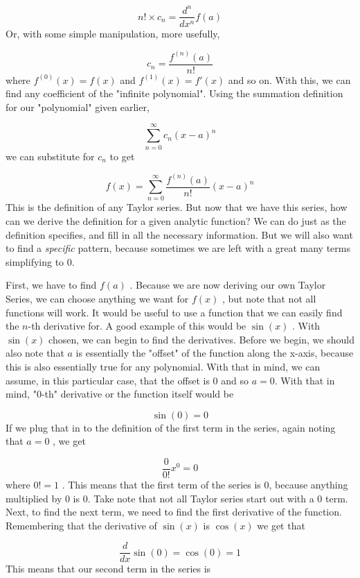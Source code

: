 $$n!\times c _n=\frac{d^n}{dx^n}f(a)$$ Or, with some simple manipulation, more usefully,



$$c _n=\frac{f^{(n)}(a)}{n!}$$ where $f^{(0)}(x)=f(x)$ and $f^{(1)}(x)=f'(x)$ and so on. With this, we can find any coefficient of the "infinite polynomial". Using the summation definition for our "polynomial" given earlier,



$$\sum _{n=0}^\infty c _n(x-a)^n$$ we can substitute for $c _n$ to get



$$f(x)=\sum _{n=0}^\infty\frac{f^{(n)}(a)}{n!}(x-a)^n$$ This is the definition of any Taylor series. But now that we have this series, how can we derive the definition for a given analytic function? We can do just as the definition specifies, and fill in all the necessary information. But we will also want to find a \textit{specific} pattern, because sometimes we are left with a great many terms simplifying to 0.



First, we have to find $f(a)$ . Because we are now deriving our own Taylor Series, we can choose anything we want for $f(x)$ , but note that not all functions will work. It would be useful to use a function that we can easily find the $n$-th derivative for. A good example of this would be $\sin(x)$ . With $\sin(x)$ chosen, we can begin to find the derivatives. Before we begin, we should also note that $a$ is essentially the "offset" of the function along the x-axis, because this is also essentially true for any polynomial. With that in mind, we can assume, in this particular case, that the offset is $0$ and so $a=0$. With that in mind, "0-th" derivative or the function itself would be



$$\sin(0)=0$$ If we plug that in to the definition of the first term in the series, again noting that $a=0$ , we get



$$\frac{0}{0!}x^0=0$$ where $0!=1$ . This means that the first term of the series is 0, because anything multiplied by 0 is 0. Take note that not all Taylor series start out with a 0 term. Next, to find the next term, we need to find the first derivative of the function. Remembering that the derivative of $\sin(x)$ is $\cos(x)$ we get that



$$\frac{d}{dx}\sin(0)=\cos(0)=1$$ This means that our second term in the series is



